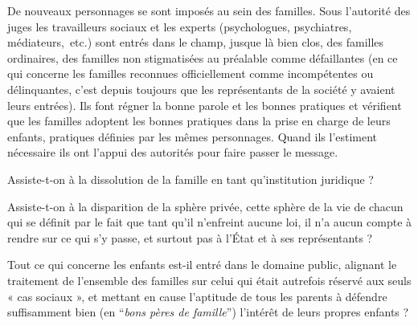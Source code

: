 De nouveaux personnages se sont imposés au sein des familles. Sous l'autorité des juges les travailleurs sociaux et les experts (psychologues, psychiatres, médiateurs,~etc.) sont entrés dans le champ, jusque là bien clos, des familles ordinaires, des familles non stigmatisées au préalable comme défaillantes (en ce qui concerne les familles reconnues officiellement comme incompétentes ou délinquantes, c'est depuis toujours que les représentants de la société y avaient leurs entrées). Ils font régner la bonne parole et les bonnes pratiques et vérifient que les familles adoptent les bonnes pratiques dans la prise en charge de leurs enfants, pratiques définies par les mêmes personnages. Quand ils l'estiment nécessaire ils ont l'appui des autorités pour faire passer le message.


 

 Assiste-t-on à la dissolution de la famille en tant qu'institution juridique ? 

 Assiste-t-on à la disparition de la sphère privée, cette sphère de la vie de chacun qui se définit par le fait que tant qu'il n'enfreint aucune loi, il n'a aucun compte à rendre sur ce qui s'y passe, et surtout pas à l'État et à ses représentants ? 

 Tout ce qui concerne les enfants est-il entré dans le domaine public, alignant le traitement de l'ensemble des familles sur celui qui était autrefois réservé aux seuls « cas sociaux », et mettant en cause l'aptitude de tous les parents à défendre suffisamment bien (en \enquote{\emph{bons pères de famille}}) l'intérêt de leurs propres enfants ?



